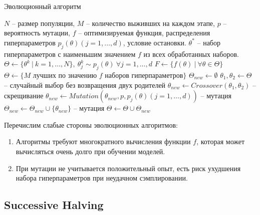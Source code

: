 \documentclass[a4paper,12pt]{article}
\begin{document}
\begin{algorithm}[H]
    \caption{Эволюционный алгоритм}\label{alg:evo}
  \begin{algorithmic}[1]
    \INPUT $N$ -- размер популяции, $M$ -- количество выживших на каждом этапе, $p$ -- вероятность мутации, $f$ -- оптимизируемая функция, распределения гиперпараметров $p_{j}(\theta) (j = 1,\dots,d)$, условие остановки.
    \OUTPUT $\theta^*$ -- набор гиперпараметров с наименьшим значением $f$ из всех обработанных наборов.
    \STATE $\Theta \gets \{\theta^k\ |\ k = 1,\dots,N\},\ \theta^k_j \sim p_j(\theta)\ \forall j = 1,\dots,d$
        \STATE $F \gets \{f(\theta)\ |\ \forall \theta \in \Theta\}$
        \STATE $\Theta \gets \{M \text{ лучших по значению } f \text{ наборов гиперпараметров}\}$
        \STATE $\Theta_{new} \gets \emptyset$
            \STATE $\theta_1, \theta_2 \gets \Theta$ -- случайный выбор без возвращения двух родителей
            \STATE $\theta_{new} \gets Crossover(\theta_1, \theta_2)$ -- скрещивание
            \STATE $\theta_{new} \gets Mutation(\theta_{new}, p, p_{j}(\theta) (j = 1,\dots,d))$ -- мутация
            \STATE $\Theta_{new} \gets \Theta_{new} \cup \{\theta_{new}\} $ -- мутация
        \ENDWHILE
        \STATE $\Theta \gets \Theta \cup \Theta_{new}$
    \ENDWHILE
  \end{algorithmic}

\end{algorithm}

Перечислим слабые стороны эволюционных алгоритмов:
\begin{enumerate}
    \item Алгоритмы требуют многократного вычисления функции $f$, которая может вычисляться очень долго при обучении моделей.
    \item При мутации не учитывается положительный опыт, есть риск ухудшения набора гиперпараметров при неудачном сэмплировании.
\end{enumerate}

\newpage

\subsection{Successive Halving}
\end{document}
